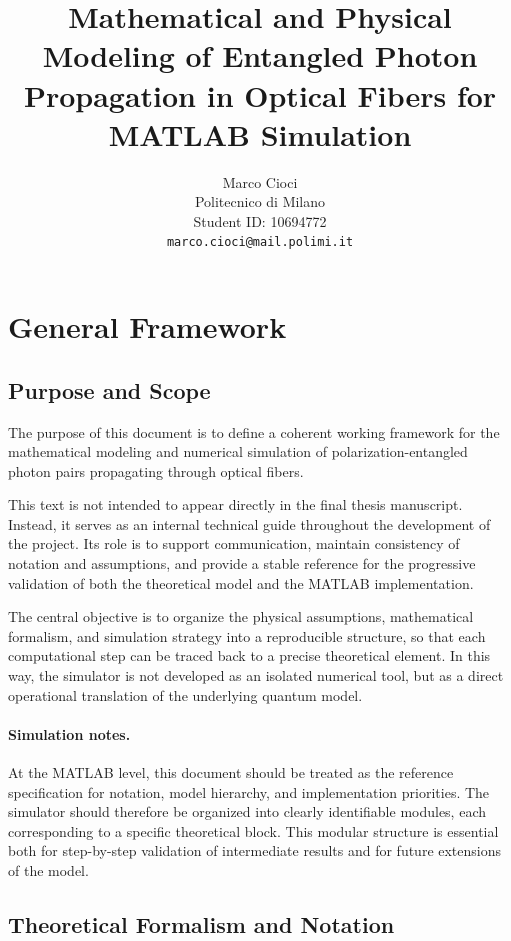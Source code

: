 \documentclass[a4paper]{article}
\title{Mathematical and Physical Modeling of Entangled Photon Propagation in Optical Fibers for MATLAB Simulation}
\author{Marco Cioci\\
Politecnico di Milano\\
Student ID: 10694772\\
\texttt{marco.cioci@mail.polimi.it}}
\date{}
\begin{document}
\maketitle

\tableofcontents

\newpage
\section{General Framework}

\subsection{Purpose and Scope}
The purpose of this document is to define a coherent working framework for the mathematical modeling and numerical simulation of polarization-entangled photon pairs propagating through optical fibers.

This text is not intended to appear directly in the final thesis manuscript. Instead, it serves as an internal technical guide throughout the development of the project. Its role is to support communication, maintain consistency of notation and assumptions, and provide a stable reference for the progressive validation of both the theoretical model and the MATLAB implementation.

The central objective is to organize the physical assumptions, mathematical formalism, and simulation strategy into a reproducible structure, so that each computational step can be traced back to a precise theoretical element. In this way, the simulator is not developed as an isolated numerical tool, but as a direct operational translation of the underlying quantum model.

\paragraph{Simulation notes.}
At the MATLAB level, this document should be treated as the reference specification for notation, model hierarchy, and implementation priorities. The simulator should therefore be organized into clearly identifiable modules, each corresponding to a specific theoretical block. This modular structure is essential both for step-by-step validation of intermediate results and for future extensions of the model.

\subsection{Theoretical Formalism and Notation}
\end{document}
